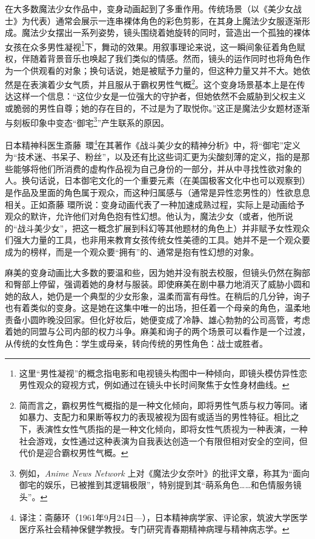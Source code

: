 在大多数魔法少女作品中，变身动画起到了多重作用。传统场景（以《美少女战士》为代表）通常会展示一连串裸体角色的彩色剪影，在其身上魔法少女服逐渐形成。魔法少女摆出一系列姿势，镜头围绕着她旋转的同时，营造出一个孤独的裸体女孩在众多男性凝视\footnote{这里“男性凝视”的概念指电影和电视镜头构图中一种倾向，即镜头模仿异性恋男性观众的窥视方式，例如通过在镜头中长时间聚焦于女性身材曲线。}\cite{ref21}下，舞动的效果。用叙事理论来说，这一瞬间象征着角色赋权，伴随着背景音乐也唤起了我们类似的情感。然而，镜头的运作同时也将角色作为一个供观看的对象；换句话说，她是被赋予力量的，但这种力量又并不大。她依然是在表演着少女气质，并且服从于霸权男性气概\footnote{简而言之，霸权男性气概指的是一种文化倾向，即将男性气质与权力等同。诸如暴力、支配力和果断等权力的表现被视为固有或适当的男性特征。相比之下，表演性女性气质指的是一种文化倾向，即将女性气质视为一种表演，一种社会游戏，女性通过这种表演为自我表达创造一个有限但相对安全的空间，但代价是迎合霸权男性气概。}\cite{ref22}。这个变身场景基本上是在传达这样一个信息：“这位少女是一位强大的守护者，但她依然不会威胁到父权主义或脆弱的男性自尊；她的存在目的，不过是为了取悦你。”这正是魔法少女题材逐渐与刻板印象中变态“御宅\footnote{例如，\emph{Anime News Network} 上对《魔法少女奈叶》的批评文章，称其为“面向御宅的娱乐，已被推到其逻辑极限”，特别提到其“萌系角色……和色情服务镜头”。}”产生联系的原因\cite{ref23}。

日本精神科医生斎藤\, 環\footnote{译注：斋藤环（1961年9月24日—），日本精神病学家、评论家，筑波大学医学医疗系社会精神保健学教授。专门研究青春期精神病理与精神病志学。}在其著作《战斗美少女的精神分析》中，将“御宅”定义为“技术迷、书呆子、粉丝”，以及还有比这些词汇更为尖酸刻薄的定义，指的是那些能够将他们所消费的虚构作品视为自己身份的一部分，并从中寻找性欲对象的人。换句话说，日本御宅文化的一个重要元素（在美国极客文化中也可以观察到）是作品及里面的角色属于观众，而这种归属感与（通常是异性恋男性的）性欲息息相关。正如斎藤 環所说：变身动画代表了一种加速成熟过程，实际上是动画给予观众的默许，允许他们对角色抱有性幻想。他认为，魔法少女（或者，他所说的“战斗美少女”，把这一概念扩展到科幻等其他题材的角色上）并非赋予女性观众们强大力量的工具，也非用来教育女孩传统女性美德的工具。她并不是一个观众要成为的榜样，而是一个观众要“拥有”的、通常是抱有性幻想的对象\cite{ref19}。

麻美的变身动画比大多数的要温和些，因为她并没有脱去校服，但镜头仍然在胸部和臀部上停留，强调着她的身材与服装。即使麻美在剧中暴力地消灭了威胁小圆和她的敌人，她仍是一个典型的少女形象，温柔而富有母性。在稍后的几分钟，询子也有着类似的变身。这是她在这集中唯一的出场，担任着一个母亲的角色，温柔地责备小圆昨晚没回家。但化好妆后，她便变成了冷静、雄心勃勃的公司高管，考虑着她的同盟与公司内部的权力斗争。麻美和询子的两个场景可以看作是一个过渡，从传统的女性角色：学生或母亲，转向传统的男性角色：战士或胜者。


